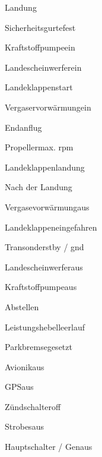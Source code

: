 \begin{memoryitem}
  \begin{checklist}{Landung}
    \item{Sicherheitsgurte}{fest}
    \item{Kraftstoffpumpe}{ein}
    \item{Landescheinwerfer}{ein}
    \item{Landeklappen}{start}
    \item{Vergaservorwärmung}{ein}
  \end{checklist}
\end{memoryitem}

\begin{memoryitem}
  \begin{checklist}{Endanflug}
    \item{Propeller}{max. rpm}
    \item{Landeklappen}{landung}
  \end{checklist}
\end{memoryitem}

\begin{memoryitem}
  \begin{checklist}{Nach der Landung}
    \item{Vergasevorwärmung}{aus}
    \item{Landeklappen}{eingefahren}
    \item{Transonder}{stby / gnd}
    \item{Landescheinwerfer}{aus}
    \item{Kraftstoffpumpe}{aus}
  \end{checklist}
\end{memoryitem}

\begin{memoryitem}
  \begin{checklist}{Abstellen}
    \item{Leistungshebel}{leerlauf}
    \item{Parkbremse}{gesetzt}
    \item{Avionik}{aus}
    \item{GPS}{aus}
    \item{Zündschalter}{off}
    \item{Strobes}{aus}
    \item{Hauptschalter / Gen}{aus}
  \end{checklist}
\end{memoryitem}

